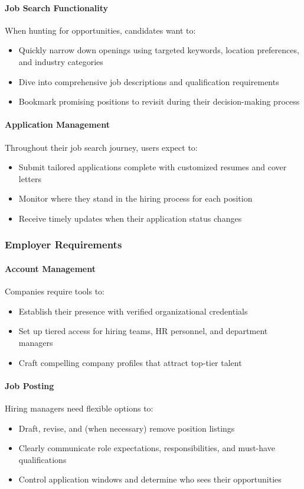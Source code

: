\documentclass[12pt,a4paper]{article}
\begin{document}
\paragraph{Job Search Functionality}
When hunting for opportunities, candidates want to:
\begin{itemize}
    \item Quickly narrow down openings using targeted keywords, location preferences, and industry categories
    \item Dive into comprehensive job descriptions and qualification requirements
    \item Bookmark promising positions to revisit during their decision-making process
\end{itemize}

\paragraph{Application Management}
Throughout their job search journey, users expect to:
\begin{itemize}
    \item Submit tailored applications complete with customized resumes and cover letters
    \item Monitor where they stand in the hiring process for each position
    \item Receive timely updates when their application status changes
\end{itemize}

\subsubsection{Employer Requirements}

\paragraph{Account Management}
Companies require tools to:
\begin{itemize}
    \item Establish their presence with verified organizational credentials
    \item Set up tiered access for hiring teams, HR personnel, and department managers
    \item Craft compelling company profiles that attract top-tier talent
\end{itemize}

\paragraph{Job Posting}
Hiring managers need flexible options to:
\begin{itemize}
    \item Draft, revise, and (when necessary) remove position listings
    \item Clearly communicate role expectations, responsibilities, and must-have qualifications
    \item Control application windows and determine who sees their opportunities
\end{itemize}
\end{document}
